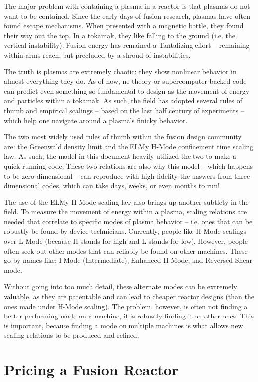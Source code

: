 \documentclass[11pt]{book}
\begin{document}
The major problem with containing a plasma in a reactor is that plasmas do not want to be contained. Since the early days of fusion research, plasmas have often found escape mechanisms. When presented with a magnetic bottle, they found their way out the top. In a tokamak, they like falling to the ground (i.e. the vertical instability). Fusion energy has remained a Tantalizing effort -- remaining within arms reach, but precluded by a shroud of instabilities.

The truth is plasmas are extremely chaotic: they show nonlinear behavior in almost everything they do. As of now, no theory or supercomputer-backed code can predict even something so fundamental to design as the movement of energy and particles within a tokamak. As such, the field has adopted several rules of thumb and empirical scalings -- based on the last half century of experiments -- which help one navigate around a plasma's finicky behavior.

The two most widely used rules of thumb within the fusion design community are: the Greenwald density limit and the ELMy H-Mode confinement time scaling law. As such, the model in this document heavily utilized the two to make a quick running code. These two relations are also why this model -- which happens to be zero-dimensional -- can reproduce with high fidelity the answers from three-dimensional codes, which can take days, weeks, or even months to run!

The use of the ELMy H-Mode scaling law also brings up another subtlety in the field. To measure the movement of energy within a plasma, scaling relations are needed that correlate to specific modes of plasma behavior -- i.e. ones that can be robustly be found by device technicians. Currently, people like H-Mode scalings over L-Mode (because H stands for high and L stands for low). However, people often seek out other modes that can reliably be found on other machines. These go by names like: I-Mode (Intermediate), Enhanced H-Mode, and Reversed Shear mode. 

Without going into too much detail, these alternate modes can be extremely valuable, as they are patentable and can lead to cheaper reactor designs (than the ones made under H-Mode scaling). The problem, however, is often not finding a better performing mode on a machine, it is robustly finding it on other ones. This is important, because finding a mode on multiple machines is what allows new scaling relations to be produced and refined.

\section{Pricing a Fusion Reactor}
\end{document}
